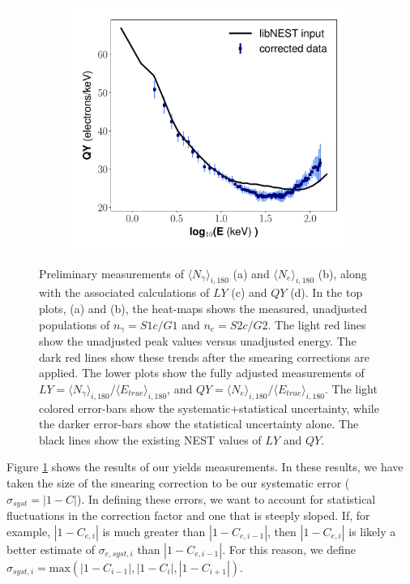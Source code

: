 \begin{figure}[h!]
\begin{subfigure}{0.5\textwidth}
  \centering
  \includegraphics[width=\textwidth]{Figures/yields_corrections/C14_QY_final_gfdcm_180Vcm_prelim.pdf}
  \caption{}
\end{subfigure}
\caption{Preliminary measurements of $\langle N_{\gamma} \rangle_{i,180}$ (a) and $\langle N_{e} \rangle_{i,180}$ (b), along with the associated calculations of $LY$ (c) and $QY$ (d). In the top plots, (a) and (b), the heat-maps shows the measured, unadjusted populations of $n_{\gamma}=S1c/G1$ and $n_{e}=S2c/G2$. The light red lines show the unadjusted peak values versus unadjusted energy. The dark red lines show these trends after the smearing corrections are applied. The lower plots show the fully adjusted measurements of $LY= \langle N_{\gamma} \rangle_{i,180}/\langle E_{true} \rangle_{i,180}$, and $QY= \langle N_{e} \rangle_{i,180}/\langle E_{true} \rangle_{i,180}$. The light colored error-bars show the systematic+statistical uncertainty, while the darker error-bars show the statistical uncertainty alone. The black lines show the existing NEST values of $LY$ and $QY$.  }
\label{fig:dat_lnqn_heatmap}
\end{figure}

Figure \ref{fig:dat_lnqn_heatmap} shows the results of our yields measurements. In these results, we have taken the size of the smearing correction to be our systematic error ($\sigma_{syst}=|1-C|$). In defining these errors, we want to account for statistical fluctuations in the correction factor and one that is steeply sloped. If, for example, $|1-C_{e,i}|$ is much greater than $|1-C_{e,i-1}|$, then $|1-C_{e,i}|$ is likely a better estimate of $\sigma_{e,syst,i}$ than $|1-C_{e,i-1}|$. For this reason, we define $\sigma_{syst,i}=\text{max}(|1-C_{i-1}|,|1-C_i|,|1-C_{i+1}|)$.

